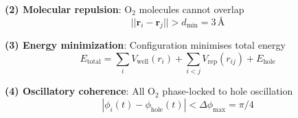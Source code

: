 \documentclass[11pt,onecolumn]{article}
\begin{document}
\textbf{(2) Molecular repulsion}: O$_2$ molecules cannot overlap
\begin{equation}
||\mathbf{r}_i - \mathbf{r}_j|| > d_{\text{min}} = 3\,\text{Å}
\end{equation}

\textbf{(3) Energy minimization}: Configuration minimises total energy
\begin{equation}
E_{\text{total}} = \sum_i V_{\text{well}}(r_i) + \sum_{i<j} V_{\text{rep}}(r_{ij}) + E_{\text{hole}}
\end{equation}

\textbf{(4) Oscillatory coherence}: All O$_2$ phase-locked to hole oscillation
\begin{equation}
|\phi_i(t) - \phi_{\text{hole}}(t)| < \Delta\phi_{\max} = \pi/4
\end{equation}
\end{document}
